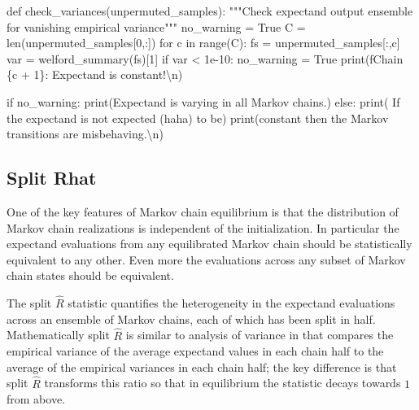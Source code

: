 \documentclass[
  letterpaper,
  DIV=11,
  numbers=noendperiod]{scrartcl}
\newenvironment{Shaded}{\begin{snugshade}}{\end{snugshade}}
\newcommand{\BuiltInTok}[1]{\textcolor[rgb]{0.00,0.23,0.31}{#1}}
\newcommand{\CharTok}[1]{\textcolor[rgb]{0.13,0.47,0.30}{#1}}
\newcommand{\CommentTok}[1]{\textcolor[rgb]{0.37,0.37,0.37}{#1}}
\newcommand{\ControlFlowTok}[1]{\textcolor[rgb]{0.00,0.23,0.31}{#1}}
\newcommand{\DecValTok}[1]{\textcolor[rgb]{0.68,0.00,0.00}{#1}}
\newcommand{\FloatTok}[1]{\textcolor[rgb]{0.68,0.00,0.00}{#1}}
\newcommand{\KeywordTok}[1]{\textcolor[rgb]{0.00,0.23,0.31}{#1}}
\newcommand{\NormalTok}[1]{\textcolor[rgb]{0.00,0.23,0.31}{#1}}
\newcommand{\OperatorTok}[1]{\textcolor[rgb]{0.37,0.37,0.37}{#1}}
\newcommand{\SpecialCharTok}[1]{\textcolor[rgb]{0.37,0.37,0.37}{#1}}
\newcommand{\SpecialStringTok}[1]{\textcolor[rgb]{0.13,0.47,0.30}{#1}}
\newcommand{\StringTok}[1]{\textcolor[rgb]{0.13,0.47,0.30}{#1}}
\newcommand{\VariableTok}[1]{\textcolor[rgb]{0.07,0.07,0.07}{#1}}
\begin{document}
\begin{Shaded}
\begin{Highlighting}[]
\KeywordTok{def}\NormalTok{ check\_variances(unpermuted\_samples):}
  \CommentTok{"""Check expectand output ensemble for vanishing empirical variance"""}
\NormalTok{  no\_warning }\OperatorTok{=} \VariableTok{True}
\NormalTok{  C }\OperatorTok{=} \BuiltInTok{len}\NormalTok{(unpermuted\_samples[}\DecValTok{0}\NormalTok{,:])}
  \ControlFlowTok{for}\NormalTok{ c }\KeywordTok{in} \BuiltInTok{range}\NormalTok{(C):}
\NormalTok{    fs }\OperatorTok{=}\NormalTok{ unpermuted\_samples[:,c]}
\NormalTok{    var }\OperatorTok{=}\NormalTok{ welford\_summary(fs)[}\DecValTok{1}\NormalTok{]}
    \ControlFlowTok{if}\NormalTok{ var }\OperatorTok{\textless{}} \FloatTok{1e{-}10}\NormalTok{:}
\NormalTok{      no\_warning }\OperatorTok{=} \VariableTok{True}
      \BuiltInTok{print}\NormalTok{(}\SpecialStringTok{f\textquotesingle{}Chain }\SpecialCharTok{\{}\NormalTok{c }\OperatorTok{+} \DecValTok{1}\SpecialCharTok{\}}\SpecialStringTok{: Expectand is constant!}\CharTok{\textbackslash{}n}\SpecialStringTok{\textquotesingle{}}\NormalTok{)}

  \ControlFlowTok{if}\NormalTok{ no\_warning:}
    \BuiltInTok{print}\NormalTok{(}\StringTok{\textquotesingle{}Expectand is varying in all Markov chains.\textquotesingle{}}\NormalTok{)}
  \ControlFlowTok{else}\NormalTok{:}
    \BuiltInTok{print}\NormalTok{(}\StringTok{\textquotesingle{}  If the expectand is not expected (haha) to be\textquotesingle{}}\NormalTok{)}
    \BuiltInTok{print}\NormalTok{(}\StringTok{\textquotesingle{}constant then the Markov transitions are misbehaving.}\CharTok{\textbackslash{}n}\StringTok{\textquotesingle{}}\NormalTok{)}
\end{Highlighting}
\end{Shaded}

\hypertarget{split-rhat}{%
\subsection{Split Rhat}\label{split-rhat}}

One of the key features of Markov chain equilibrium is that the
distribution of Markov chain realizations is independent of the
initialization. In particular the expectand evaluations from any
equilibrated Markov chain should be statistically equivalent to any
other. Even more the evaluations across any subset of Markov chain
states should be equivalent.

The split \(\hat{R}\) statistic quantifies the heterogeneity in the
expectand evaluations across an ensemble of Markov chains, each of which
has been split in half. Mathematically split \(\hat{R}\) is similar to
analysis of variance in that compares the empirical variance of the
average expectand values in each chain half to the average of the
empirical variances in each chain half; the key difference is that split
\(\hat{R}\) transforms this ratio so that in equilibrium the statistic
decays towards \(1\) from above.
\end{document}
